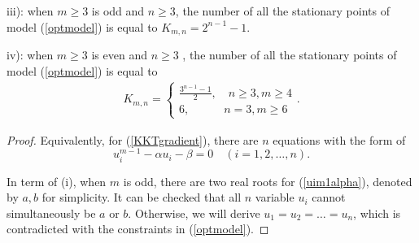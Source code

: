 \begin{lemma}
			iii): when  $m \ge 3 $ is  odd and $n \ge 3$,  the number of all the stationary points of  model (\ref{optmodel}) is equal to  $	K_{m,n} = 2^{n-1}-1$.
			
		iv): when  $m \ge 3 $ is  even  and $n \ge 3$ ,  the number of all the stationary points of  model (\ref{optmodel}) is equal to 
		\begin{align}
		K_{m,n}=
	\begin{cases}
 \frac 
{ 3^{ n-1} - 1}
{2}  , \quad   n \ge  3, m\ge 4  \\
6  , \quad \quad \quad  n=3, m\ge 6
	\end{cases}.
		\end{align}
		
\end{lemma}


\begin{proof}
	Equivalently,  for (\ref{KKTgradient}), there   are   $n$  equations  with  the  form of 
\begin{equation}\label{uim1alpha} 
u_{i}^{m-1} -\alpha u_{i} - \beta =0  \quad  (i=1,2, \dots, n).
\end{equation}


In term of (i), 
when $m$ is  odd,  there  are  two  real  roots for 
(\ref{uim1alpha}), 
  denoted by $a,b$ for  simplicity. 
It can be  checked that 
all  $n$ variable 
$u_{i}$ cannot  simultaneously 
be  $a$  or  $b$. 
Otherwise, we  will 
 derive    $ u_{1} =u_{2} = \dots = u_{n}$, which  is contradicted   with  the  constraints  in  (\ref{optmodel}).



\end{proof}
